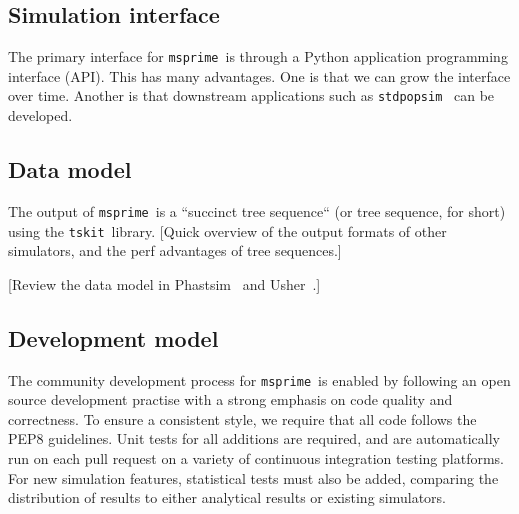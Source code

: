 \documentclass{article}
\newcommand{\msprime}[0]{\texttt{msprime}}
\newcommand{\tskit}[0]{\texttt{tskit}}
\begin{document}
\subsection*{Simulation interface}
The primary interface for \msprime\ is through a Python application
programming interface (API). This has many advantages. One is
that we can grow the interface over time. Another is that
downstream applications such as \texttt{stdpopsim}~\citep{adrion2019community}
can be developed.

\subsection*{Data model}
The output of \msprime\ is a ``succinct tree sequence`` (or tree sequence,
for short) using the \tskit\ library. [Quick overview of the output formats
of other simulators, and the perf advantages of tree sequences.]

[Review the data model in Phastsim~\cite{demaio2021phastsim} and
Usher~\citep{turakhia2021ultrafast}.]

\subsection*{Development model}
The community development process for \msprime\ is enabled by following an
open source development practise with a strong emphasis on code quality
and correctness. To ensure a consistent style, we require that all code
follows the PEP8 guidelines. Unit tests for all additions are required, and
are automatically run on each pull request on a variety of continuous
integration testing platforms. For new simulation features, statistical tests
must also be added, comparing the distribution of results to either analytical
results or existing simulators.
\end{document}
